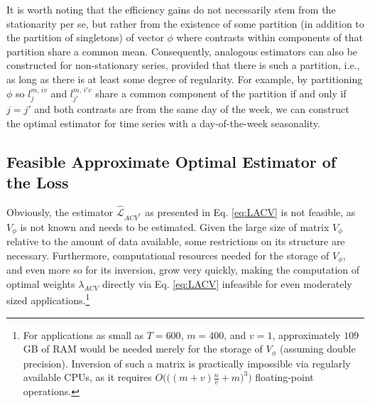 \documentclass[11pt,dvipsnames]{article}
\begin{document}
It is worth noting that the efficiency gains do not necessarily stem from the stationarity per se, but rather from the existence of some partition (in addition to the partition of singletons) of vector $ \phi $ where contrasts within components of that partition share a common mean. Consequently, analogous estimators can also be constructed for non-stationary series, provided that there is such a partition, i.e., as long as there is at least some degree of regularity. For example, by partitioning $ \phi $ so $ l_{j}^{m,\,iv } $ and $ l_{j'}^{m,\,i'v } $ share a common component of the partition if and only if $ j=j' $ and both contrasts are from the same day of the week, we can construct the optimal estimator for time series with a day-of-the-week seasonality. 

\subsection{Feasible Approximate Optimal Estimator of the Loss}
Obviously, the estimator $\widehat{\mathcal{L}}_{ACV^{*}} $ as presented in Eq. \ref{eq:LACV} is not feasible, as $ V_{\phi} $ is not known and needs to be estimated. Given the large size of matrix $ V_{\phi} $ relative to the amount of data available, some restrictions on its structure are necessary. Furthermore, computational resources needed for the storage of $ V_{\phi} $, and even more so for its inversion, grow very quickly, making the computation of optimal weights $ \lambda_{ACV} $ directly via Eq. \ref{eq:LACV} infeasible for even moderately sized applications.\footnote{For applications as small as $ T=600 $, $ m=400 $, and $ v=1 $, approximately $ 109 $ GB of RAM would be needed merely for the storage of $ V_{\phi} $ (assuming double precision). Inversion of such a matrix is practically impossible via regularly available CPUs, as it requires $ O\big( \big( (m+v)\frac{n}{v}+m\big) ^{3}\big)  $ floating-point operations.}
\end{document}
